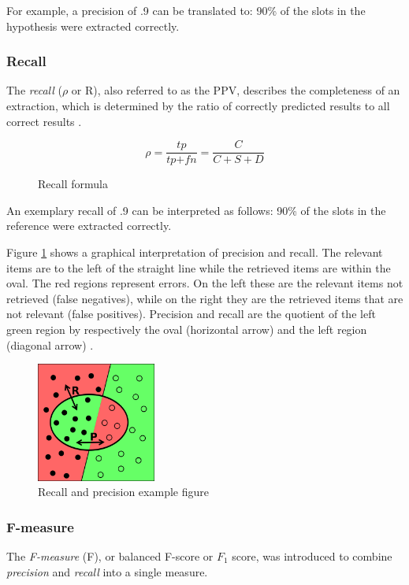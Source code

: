 For example, a precision of .9 can be translated to: 90\% of the slots in the hypothesis were extracted correctly.

\subsubsection{Recall}
The \textit{recall} (\ensuremath{\rho} or R), also referred to as the \gls{PPV}, describes the completeness of an extraction, which is determined by the ratio of correctly predicted results to all correct results \cite{Carstensen:2010}.

\begin{figure}[H]
\begin{displaymath}
	\rho = \frac{\textit{tp}}{\textit{tp} + \textit{fn}} = \frac{C}{C+S+D}
\end{displaymath}
\caption{Recall formula}
\end{figure}

An exemplary recall of .9 can be interpreted as follows: 90\% of the slots in the reference were extracted correctly.

Figure \ref{fig:recall-precision} shows a graphical interpretation of precision and recall. The relevant items are to the left of the straight line while the retrieved items are within the oval. The red regions represent errors. On the left these are the relevant items not retrieved (false negatives), while on the right they are the retrieved items that are not relevant (false positives). Precision and recall are the quotient of the left green region by respectively the oval (horizontal arrow) and the left region (diagonal arrow) \cite{Wikipedia:Precision_and_recall}.

\begin{figure}[H]
\centering
\includegraphics[width=0.35\textwidth]{recall-precision.png}
\caption{Recall and precision example figure \cite{Wikipedia:Precision_and_recall}}
\label{fig:recall-precision}
\end{figure}

\subsubsection{F-measure}
The \textit{F-measure} (F), or  balanced F-score or $\textit{F}_\textit{1}$ score, was introduced to combine \textit{precision} and \textit{recall} into a single measure.

